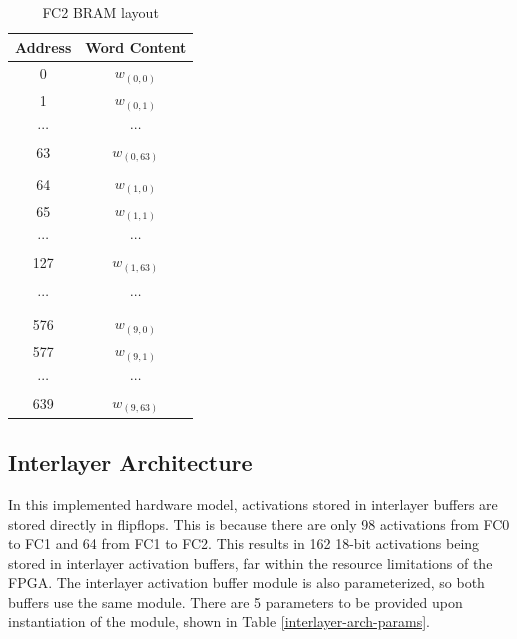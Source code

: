 \begin{table}
	\centering
	\begin{tabular}{|c|c|}
		\hline
		\textbf{Address} & \textbf{Word Content} \\\hline
		0 & $w_{(0, 0)}$\\
		1 & $w_{(0, 1)}$\\
		$\cdots$ & $\cdots$ \\			
		63 & $w_{(0, 63)}$\\
		& \\
		64 & $w_{(1, 0)}$ \\
		65 & $w_{(1, 1)}$ \\
		$\cdots$ & $\cdots$ \\	
		127 & $w_{(1, 63)}$\\
		& \\
		$\cdots$ & $\cdots$ \\	
		& \\ 
		576 & $w_{(9, 0)}$ \\
		577 & $w_{(9, 1)}$ \\
		$\cdots$ & $\cdots$ \\			
		639 & $w_{(9, 63)}$ \\
		\hline
	\end{tabular}	
	\caption{FC2 BRAM layout}	
	\label{fc2-bram}
\end{table}

\subsection{Interlayer Architecture}
In this implemented hardware model, activations stored in interlayer buffers are stored directly in flipflops. This is because there are only 98 activations from FC0 to FC1 and 64 from FC1 to FC2. This results in 162 18-bit activations being stored in interlayer activation buffers, far within the resource limitations of the FPGA.  The interlayer activation buffer module is also parameterized, so both buffers use the same module. There are 5 parameters to be provided upon instantiation of the module, shown in Table \ref{interlayer-arch-params}.

